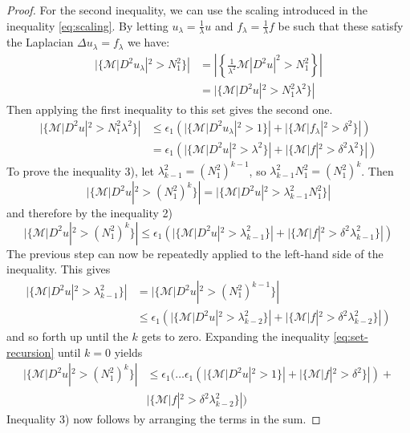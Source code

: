 \documentclass[12pt]{artikel1}
\begin{document}
\begin{proof}
    For the second inequality, we can use the scaling introduced in the inequality \ref{eq:scaling}. By letting $u_\lambda=\frac{1}{\lambda}u$ and $f_\lambda=\frac{1}{\lambda}f$ be such that these satisfy the Laplacian $\Delta u_\lambda=f_\lambda$ we have:
    \begin{align*}
        |\{\mathcal{M}|D^2u_\lambda|^2>N_1^2\}|&=\left|\left\{\frac{1}{\lambda^2}\mathcal{M}|D^2u|^2>N_1^2\right\}\right| \\
        &=|\{\mathcal{M}|D^2u|^2>N_1^2\lambda^2\}|
    \end{align*}
    Then applying the first inequality to this set gives the second one.
    \begin{align*}
        |\{\mathcal{M}|D^2u|^2>N_1^2\lambda^2\}|&\leq\epsilon_1(|\{\mathcal{M}|D^2u_\lambda|^2>1\}|+|\{\mathcal{M}|f_\lambda|^2>\delta^2\}|) \\
        &=\epsilon_1(|\{\mathcal{M}|D^2u|^2>\lambda^2\}|+|\{\mathcal{M}|f|^2>\delta^2\lambda^2\}|)
    \end{align*}
    To prove the inequality 3), let $\lambda_{k-1}^2=(N_1^2)^{k-1}$, so $\lambda^2_{k-1}N^2_1=(N_1^2)^k$. Then
    \begin{equation*}
        |\{\mathcal{M}|D^2u|^2>(N_1^2)^k\}|=|\{\mathcal{M}|D^2u|^2>\lambda_{k-1}^2N_1^2\}|
    \end{equation*}
    and therefore by the inequality 2)
    \begin{equation}\label{eq:set-recursion}
        |\{\mathcal{M}|D^2u|^2>(N_1^2)^k\}|\leq\epsilon_1(|\{\mathcal{M}|D^2u|^2>\lambda_{k-1}^2\}|+|\{\mathcal{M}|f|^2>\delta^2\lambda^2_{k-1}\}|)
    \end{equation}
    The previous step can now be repeatedly applied to the left-hand side of the inequality. This gives
    \begin{align*}
        |\{\mathcal{M}|D^2u|^2>\lambda_{k-1}^2\}|&=|\{\mathcal{M}|D^2u|^2>(N_1^2)^{k-1}\}| \\
        &\leq\epsilon_1(|\{\mathcal{M}|D^2u|^2>\lambda_{k-2}^2\}|+|\{\mathcal{M}|f|^2>\delta^2\lambda^2_{k-2}\}|)
    \end{align*}
    and so forth up until the $k$ gets to zero. Expanding the inequality \ref{eq:set-recursion} until $k=0$ yields
    \begin{align*}
        |\{\mathcal{M}|D^2u|^2>(N_1^2)^k\}|&\leq\epsilon_1(\ldots\epsilon_1(|\{\mathcal{M}|D^2u|^2>1\}|+|\{\mathcal{M}|f|^2>\delta^2\}|)+\\\
        &|\{\mathcal{M}|f|^2>\delta^2\lambda^2_{k-2}\}|)
    \end{align*}
    Inequality 3) now follows by arranging the terms in the sum.
\end{proof}
\end{document}
